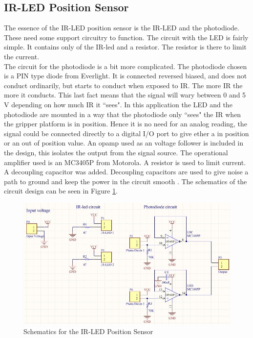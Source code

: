 \subsection{IR-LED Position Sensor}
The essence of the IR-LED position sensor is the IR-LED and the photodiode. These need some support circuitry to function. The circuit with the LED is fairly simple. It contains only of the IR-led and a resistor. The resistor is there to limit the current.\\\newline
The circuit for the photodiode is a bit more complicated. The photodiode chosen is a PIN type diode from Everlight. It is connected reversed biased, and does not conduct ordinarily, but starts to conduct when exposed to IR. The more IR the more it conducts. This last fact means that the signal will wary between 0 and 5 V depending on how much IR it ``sees". In this application the LED and the photodiode are mounted in a way that the photodiode only ``sees" the IR when the gripper platform is in position. Hence it is no need for an analog reading, the signal could be connected directly to a digital I/O port to give ether a in position or an out of position value. An opamp used as an voltage follower is included in the design, this isolates the output from the signal source. The operational amplifier used is an MC3405P from Motorola. A resistor is used to limit current.\\\newline
A decoupling capacitor was added. Decoupling capacitors are used to give noise a path to ground and keep the power in the circuit smooth \citep{embedded}. The schematics of the circuit design can be seen in Figure \ref{ledSchematic}. 
\begin{figure}[H]
\centering
\includegraphics[width = 15cm]{fig/krets/ledSchematic.jpg}
\caption{Schematics for the IR-LED Position Sensor}
\label{ledSchematic}
\end{figure}
